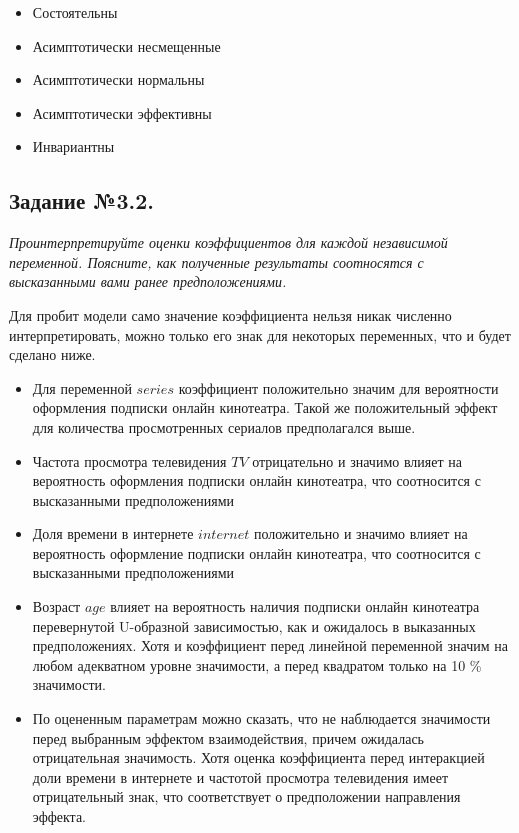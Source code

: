 \documentclass[a4paper,12pt]{article}
\begin{document}
	\begin{itemize}
		\item Состоятельны
		\item Асимптотически несмещенные
		\item Асимптотически нормальны
		\item Асимптотически эффективны
		\item Инвариантны
	\end{itemize}

		
	\subsection{Задание №3.2.}
	\textit{
	Проинтерпретируйте оценки коэффициентов для каждой независимой переменной. Поясните, как полученные результаты соотносятся с высказанными вами ранее предположениями. }

	\vspace{0.2cm}
	
	Для пробит модели само значение коэффициента нельзя никак численно интерпретировать, можно только его знак для некоторых переменных, что и будет сделано ниже.
	
	\begin{itemize}
			\item	Для переменной $series$ коэффициент положительно значим для вероятности оформления подписки онлайн кинотеатра. Такой же положительный эффект для количества просмотренных сериалов предполагался выше.
			\item 	Частота просмотра телевидения $TV$ отрицательно и значимо влияет на вероятность оформления подписки онлайн кинотеатра, что соотносится с высказанными предположениями
			\item 	Доля времени в интернете $internet$ положительно и значимо влияет на вероятность оформление подписки онлайн кинотеатра, что соотносится с высказанными предположениями
			\item 	Возраст $age$ влияет на вероятность наличия подписки онлайн кинотеатра перевернутой U-образной зависимостью, как и ожидалось в выказанных предположениях. Хотя и коэффициент перед линейной переменной значим на любом адекватном уровне значимости, а перед квадратом только на 10 \% значимости.
			\item По оцененным параметрам можно сказать, что не наблюдается значимости перед выбранным эффектом взаимодействия, причем ожидалась отрицательная значимость. Хотя оценка коэффициента перед интеракцией доли времени в интернете и частотой просмотра телевидения имеет отрицательный знак, что соответствует о предположении направления эффекта.
	\end{itemize}
	
\end{document}
